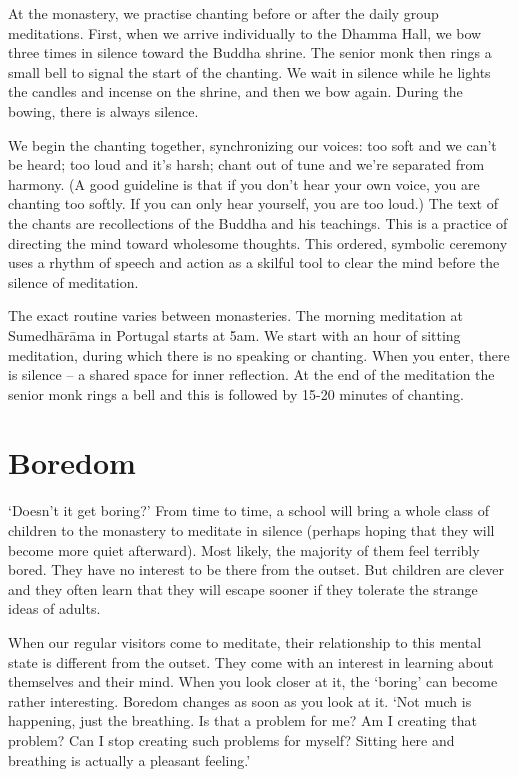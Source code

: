 
\noindent At the monastery, we practise chanting before or after the
daily group meditations. First, when we arrive individually to the
Dhamma Hall, we bow three times in silence toward the Buddha shrine. The
senior monk then rings a small bell to signal the start of the chanting.
We wait in silence while he lights the candles and incense on the
shrine, and then we bow again. During the bowing, there is always
silence.

We begin the chanting together, synchronizing our voices: too soft and
we can't be heard; too loud and it's harsh; chant out of tune and we're
separated from harmony. (A good guideline is that if you don't hear your
own voice, you are chanting too softly. If you can only hear yourself,
you are too loud.) The text of the chants are recollections of the
Buddha and his teachings. This is a practice of directing the mind
toward wholesome thoughts. This ordered, symbolic ceremony uses a rhythm
of speech and action as a skilful tool to clear the mind before the
silence of meditation.

The exact routine varies between monasteries. The morning meditation at
Sumedhārāma in Portugal starts at 5am. We start with an hour of sitting
meditation, during which there is no speaking or chanting. When you
enter, there is silence -- a shared space for inner reflection. At the
end of the meditation the senior monk rings a bell and this is followed
by 15-20 minutes of chanting.

\section{Boredom}


\noindent `Doesn't it get boring?' From time to time, a school will
bring a whole class of children to the monastery to meditate in silence
(perhaps hoping that they will become more quiet afterward). Most
likely, the majority of them feel terribly bored. They have no interest
to be there from the outset. But children are clever and they often
learn that they will escape sooner if they tolerate the strange ideas of
adults.

When our regular visitors come to meditate, their relationship to this
mental state is different from the outset. They come with an interest in
learning about themselves and their mind. When you look closer at it,
the `boring' can become rather interesting. Boredom changes as soon as
you look at it. `Not much is happening, just the breathing. Is that a
problem for me? Am I creating that problem? Can I stop creating such
problems for myself? Sitting here and breathing is actually a pleasant
feeling.'

